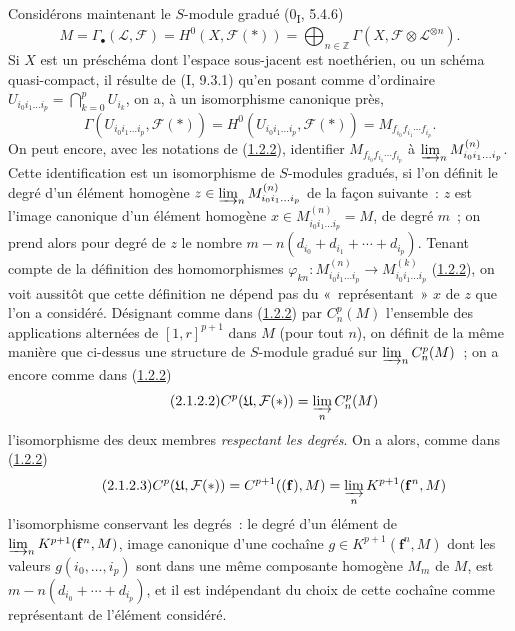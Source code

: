 \begin{env}[2.1.2]
\label{III.2.1.2-fr}
Considérons maintenant le $S$-module gradué (0\textsubscript{I}, 5.4.6)
\begin{equation}
\label{III.2.1.2.1-fr}
\tag{2.1.2.1}
M=\Gamma_\bullet(\mathcal L,\mathcal F)
=H^0(X,\mathcal F(*))
=\bigoplus_{n\in\mathbb Z}
\Gamma(X,\mathcal F\otimes\mathcal L^{\otimes n}).
\end{equation}
Si $X$ est un préschéma dont l'espace sous-jacent est noethérien, ou un
schéma quasi-compact, il résulte de (I, 9.3.1) qu'en posant comme d'ordinaire
$U_{i_0i_1\ldots i_p}=\bigcap_{k=0}^pU_{i_k}$, on a, à un isomorphisme
canonique près,
\[
\Gamma(U_{i_0i_1\ldots i_p},\mathcal F(*))
=H^0(U_{i_0i_1\ldots i_p},\mathcal F(*))
=M_{f_{i_0}f_{i_1}\cdots f_{i_p}}.
\]
On peut encore, avec les notations de
(\hyperref[III.1.2.2-fr]{1.2.2}), identifier
$M_{f_{i_0}f_{i_1}\cdots f_{i_p}}$ à
$\varinjlim_n M_{i_0i_1\ldots i_p}^{(n)}$. Cette identification est un
isomorphisme de $S$-modules gradués, si l'on définit le degré d'un élément
homogène $z\in\varinjlim_n M_{i_0i_1\ldots i_p}^{(n)}$ de la façon
suivante~: $z$ est l'image canonique d'un élément homogène
$x\in M_{i_0i_1\ldots i_p}^{(n)}=M$, de degré $m$~; on prend alors pour
degré de $z$ le nombre
$m-n(d_{i_0}+d_{i_1}+\cdots+d_{i_p})$. Tenant compte de la définition des
homomorphismes
$\varphi_{kn}:M_{i_0i_1\ldots i_p}^{(n)}\to
M_{i_0i_1\ldots i_p}^{(k)}$ (\hyperref[III.1.2.2-fr]{1.2.2}), on voit
aussitôt que cette définition ne dépend pas du «~représentant~» $x$ de $z$
que l'on a considéré. Désignant comme dans
(\hyperref[III.1.2.2-fr]{1.2.2}) par $C_n^p(M)$ l'ensemble des applications
alternées de $[1,r]^{p+1}$ dans $M$ (pour tout $n$), on définit de la même
manière que ci-dessus une structure de $S$-module gradué sur
$\varinjlim_n C_n^p(M)$~; on a encore comme dans
(\hyperref[III.1.2.2-fr]{1.2.2})
\begin{equation}
\label{III.2.1.2.2-fr}
\tag{2.1.2.2}
C^p(\mathfrak U,\mathcal F(*))=\varinjlim_n C_n^p(M)
\end{equation}
l'isomorphisme des deux membres \emph{respectant les degrés}. On a alors,
comme dans (\hyperref[III.1.2.2-fr]{1.2.2})
\begin{equation}
\label{III.2.1.2.3-fr}
\tag{2.1.2.3}
C^p(\mathfrak U,\mathcal F(*))
=C^{p+1}((\mathbf f),M)
=\varinjlim_n K^{p+1}(\mathbf f^n,M)
\end{equation}
l'isomorphisme conservant les degrés~: le degré d'un élément de
$\varinjlim_n K^{p+1}(\mathbf f^n,M)$, image canonique d'une cochaîne
$g\in K^{p+1}(\mathbf f^n,M)$ dont les valeurs
$g(i_0,\ldots,i_p)$ sont dans une même composante homogène $M_m$ de $M$,
est $m-n(d_{i_0}+\cdots+d_{i_p})$, et il est indépendant du choix de cette
cochaîne comme représentant de l'élément considéré.
\end{env}

